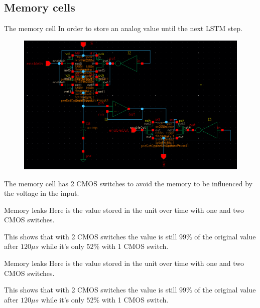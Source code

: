 \documentclass{beamer}
\newcommand{\includepgf}[3]{\resizebox{#1}{#2}{}}
\begin{document}
\subsection{Memory cells}
\begin{frame}{The memory cell}
  In order to store an analog value until the next LSTM step.
  \begin{figure}
    \centering
    \includegraphics[height=0.5\textheight]{figures/memcell-circuit.png}
  \end{figure}
  The memory cell has 2 CMOS switches to avoid the memory to be influenced by the voltage in the input.
\end{frame}
\begin{frame}{Memory leaks}
  Here is the value stored in the unit over time with one and two CMOS switches.
  \begin{figure}
    \centering
    \resizebox{!}{0.4\textheight}{}
  \end{figure}
  This shows that with 2 CMOS switches the value is still $99\%$ of the original value after $120 \mu s$ while it's only $52\%$ with 1 CMOS switch.
\end{frame}
\begin{frame}{Memory leaks}
  Here is the value stored in the unit over time with one and two CMOS switches.
  \begin{figure}
    \centering
    \includepgf{!}{.4\textheight}{figures/memcell-graph.pgf}
  \end{figure}
  This shows that with 2 CMOS switches the value is still $99\%$ of the original value after $120 \mu s$ while it's only $52\%$ with 1 CMOS switch.
\end{frame}
\end{document}
